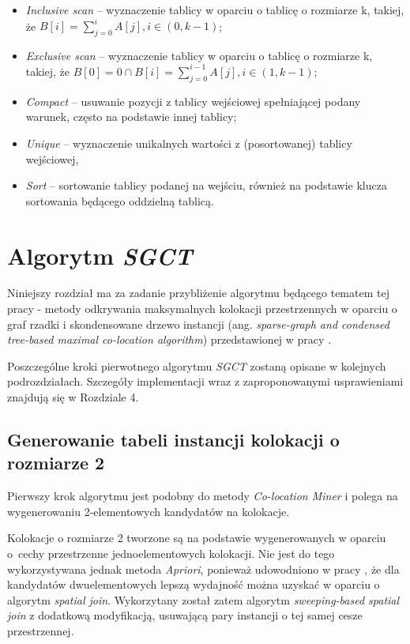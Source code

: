 \documentclass[12pt]{article}
\begin{document}
\begin{itemize}
\item \textit{Inclusive scan} – wyznaczenie tablicy w oparciu o tablicę o rozmiarze k, takiej, że $ B[i] = \sum\limits_{j=0}^{i} A[j], i \in (0, k-1) $;
\item \textit{Exclusive scan} – wyznaczenie tablicy w oparciu o tablicę o rozmiarze k, takiej, że $ B[0] = 0 \cap B[i] = \sum\limits_{j=0}^{i-1} A[j], i \in (1,k-1) $;
\item \textit{Compact} – usuwanie pozycji z tablicy wejściowej spełniającej podany warunek, często na podstawie innej tablicy;
\item \textit{Unique} – wyznaczenie unikalnych wartości z (posortowanej) tablicy wejściowej,
\item \textit{Sort} – sortowanie tablicy podanej na wejściu, również na podstawie klucza sortowania będącego oddzielną tablicą.
\end{itemize}
\newpage

\section{Algorytm \textit{SGCT}}
\label{sec:china}

Niniejszy rozdział ma za zadanie przybliżenie algorytmu będącego tematem tej pracy - metody odkrywania maksymalnych kolokacji przestrzennych w oparciu o graf rzadki i skondensowane drzewo instancji (ang. \textit{sparse-graph and condensed tree-based maximal co-location algorithm}) przedstawionej w pracy \cite{chinczyki}. 

Poszczególne kroki pierwotnego algorytmu \textit{SGCT} zostaną opisane w kolejnych podrozdziałach. Szczegóły implementacji wraz z zaproponowanymi usprawieniami znajdują się w Rozdziale 4.

\subsection{Generowanie tabeli instancji kolokacji o rozmiarze 2}

Pierwszy krok algorytmu jest podobny do metody \textit{Co-location Miner} i polega na wygenerowaniu 2-elementowych kandydatów na kolokacje. 

Kolokacje o rozmiarze 2 tworzone są na podstawie wygenerowanych w oparciu o~cechy przestrzenne jednoelementowych kolokacji. Nie jest do tego wykorzystywana jednak metoda \textit{Apriori}, ponieważ udowodniono w pracy \cite{huang}, że dla kandydatów dwuelementowych lepszą wydajność można uzyskać w oparciu o algorytm \textit{spatial join}. Wykorzytany został zatem algorytm \textit{sweeping-based spatial join} \cite{spatial} z dodatkową modyfikacją, usuwającą pary instancji o tej samej cesze przestrzennej. 
\end{document}
